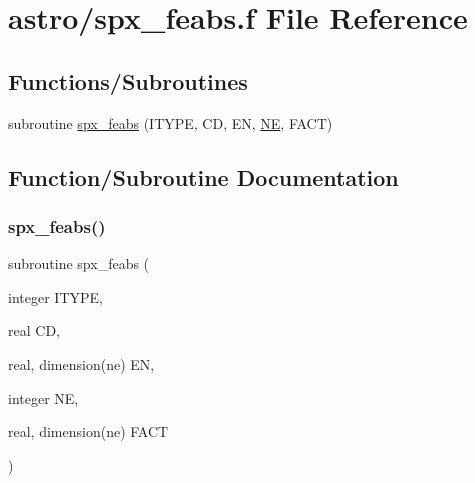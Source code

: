 \hypertarget{spx__feabs_8f}{}\section{astro/spx\+\_\+feabs.f File Reference}
\label{spx__feabs_8f}
\subsection*{Functions/\+Subroutines}
\begin{DoxyCompactItemize}
\item 
subroutine \hyperlink{spx__feabs_8f_a7a9ff8d820937030286e9d3d11d6785f}{spx\+\_\+feabs} (I\+T\+Y\+PE, CD, EN, \hyperlink{eval__tab_8h_a5af9139e882aef6c820ae908589a40d6}{NE}, F\+A\+CT)
\end{DoxyCompactItemize}


\subsection{Function/\+Subroutine Documentation}
\mbox{\label{spx__feabs_8f_a7a9ff8d820937030286e9d3d11d6785f}} 
\subsubsection{\texorpdfstring{spx\+\_\+feabs()}{spx\_feabs()}}
{\footnotesize\ttfamily subroutine spx\+\_\+feabs (\begin{DoxyParamCaption}\item[{integer}]{I\+T\+Y\+PE,  }\item[{real}]{CD,  }\item[{real, dimension(ne)}]{EN,  }\item[{integer}]{NE,  }\item[{real, dimension(ne)}]{F\+A\+CT }\end{DoxyParamCaption})}

